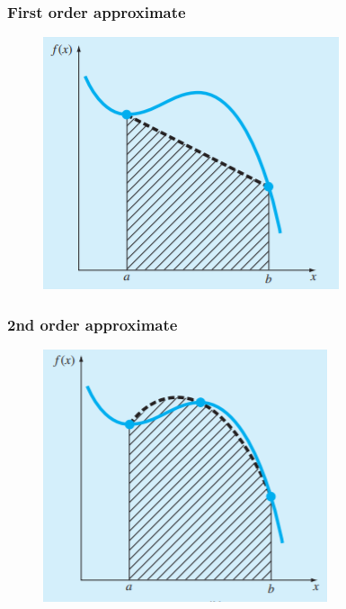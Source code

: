 \documentclass{if-beamer}
\begin{document}
\begin{frame}
	\frametitle{First order approximate}
	\begin{figure}
		\centering
		\includegraphics[width = .7\textwidth]{figures/firstO}
	\end{figure}
\end{frame}

\begin{frame}
	\frametitle{2nd order approximate}
	\begin{figure}
		\centering
		\includegraphics[width = .7\textwidth]{figures/secondO}
	\end{figure}
\end{frame}
\end{document}
